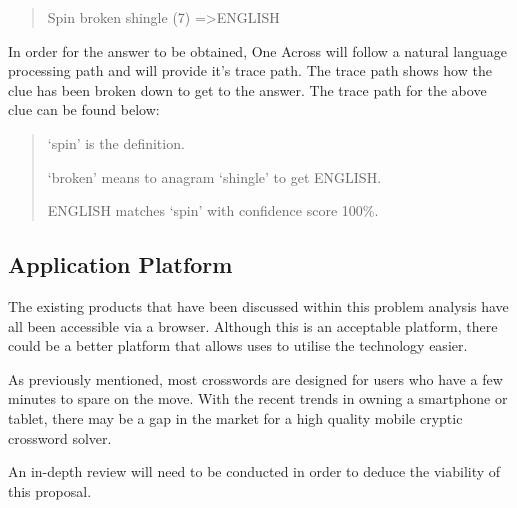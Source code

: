 \begin{quote}
Spin broken shingle (7) =\textgreater  ENGLISH
\end{quote}

In order for the answer to be obtained, One Across will follow a natural 
language processing path and will provide it's trace path. The trace path shows
how the clue has been broken down to get to the answer. The trace path for the 
above clue can be found below:

\begin{quote}
`spin' is the definition.

`broken' means to anagram `shingle' to get ENGLISH.

ENGLISH matches `spin' with confidence score 100\%.
\end{quote}


\subsection{Application Platform}

The existing products that have been discussed within this problem analysis 
have all been accessible via a browser. Although this is an acceptable 
platform, there could be a better platform that allows uses to utilise the 
technology easier.

As previously mentioned, most crosswords are designed for users who have a few 
minutes to spare on the move. With the recent trends in owning a smartphone or 
tablet, there may be a gap in the market for a high quality mobile cryptic 
crossword solver.

An in-depth review will need to be conducted in order to deduce the viability 
of this proposal.
